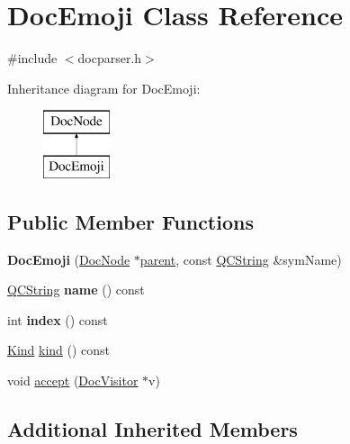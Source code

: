 \hypertarget{class_doc_emoji}{}\section{Doc\+Emoji Class Reference}
\label{class_doc_emoji}


{\ttfamily \#include $<$docparser.\+h$>$}

Inheritance diagram for Doc\+Emoji\+:\begin{figure}[H]
\begin{center}
\leavevmode
\includegraphics[height=2.000000cm]{class_doc_emoji}
\end{center}
\end{figure}
\subsection*{Public Member Functions}
\begin{DoxyCompactItemize}
\item 
\mbox{\label{class_doc_emoji_a9d403e0782dabee1661171d7ed34468c}} 
{\bfseries Doc\+Emoji} (\mbox{\hyperlink{class_doc_node}{Doc\+Node}} $\ast$\mbox{\hyperlink{class_doc_node_a73e8ad29a91cfceb0968eb00db71a23d}{parent}}, const \mbox{\hyperlink{class_q_c_string}{Q\+C\+String}} \&sym\+Name)
\item 
\mbox{\label{class_doc_emoji_a5c754f3d5f362c43008fe6bf6d11147a}} 
\mbox{\hyperlink{class_q_c_string}{Q\+C\+String}} {\bfseries name} () const
\item 
\mbox{\label{class_doc_emoji_a07de0cec2007bc102188a656a354b8b9}} 
int {\bfseries index} () const
\item 
\mbox{\hyperlink{class_doc_node_aebd16e89ca590d84cbd40543ea5faadb}{Kind}} \mbox{\hyperlink{class_doc_emoji_a9b09bd07ad077b411254b04ce695ef12}{kind}} () const
\item 
void \mbox{\hyperlink{class_doc_emoji_a6c03f9d2925884b0357a536228e1fb99}{accept}} (\mbox{\hyperlink{class_doc_visitor}{Doc\+Visitor}} $\ast$v)
\end{DoxyCompactItemize}
\subsection*{Additional Inherited Members}


